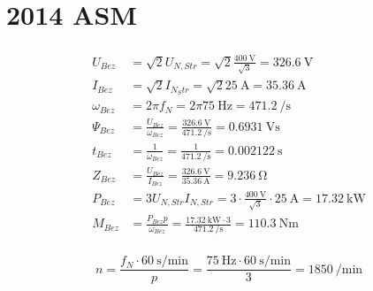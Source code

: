 \documentclass[11pt,a4paper]{scrartcl}
\newcommand{\0}{_{\mybr{0}}}
\newcommand{\1}{_{\mybr{1}}}
\newcommand{\2}{_{\mybr{2}}}
\begin{document}
\clearpage
\part{2014 ASM}
\section{}
\subsection{}
\begin{align}
U_{Bez}&=\sqrt{2}U_{N,Str}=\sqrt{2}\frac{\SI{400}{\volt}}{\sqrt{3}}=\SI{326.6}{\volt}\\
I_{Bez}&=\sqrt{2}I_{N_Str}=\sqrt{2}\SI{25}\ampere=\SI{35.36}{\ampere}\\
\omega_{Bez}&=2\pi f_N=2 \pi \SI{75}{\hertz}=\SI{471.2}{\per\second}\\
\Psi_{Bez}&=\frac{U_{Bez}}{\omega_{Bez}}=\frac{\SI{326.6}{\volt}}{\SI{471.2}{\per\second}}=\SI{0.6931}{\volt\second}\\
t_{Bez}&=\frac{1}{\omega_{Bez}}=\frac{1}{\SI{471.2}{\per\second}}=\SI{0.002122}{\second}\\
Z_{Bez}&=\frac{U_{Bez}}{I_{Bez}}=\frac{\SI{326.6}{\volt}}{\SI{35.36}{\ampere}}=\SI{9.236}{\ohm}\\
P_{Bez}&=3U_{N,Str}I_{N,Str}=3\cdot\frac{\SI{400}{\volt}}{\sqrt{3}}\cdot\SI{25}{\ampere}=\SI{17.32}{\kilo\watt}\\
M_{Bez}&=\frac{P_{Bez}p}{\omega_{Bez}}=\frac{\SI{17.32}{\kilo\watt}\cdot 3}{\SI{471.2}{\per\second}}=\SI{110.3}{\newton\metre}
\end{align}

\subsection{}
\begin{equation}
n=\frac{f_N\cdot\SI{60}{\second\per\minute}}{p}=\frac{\SI{75}{\hertz}\cdot\SI{60}{\second\per\minute}}{3}=\SI{1850}{\per\minute}
\end{equation}
\end{document}
